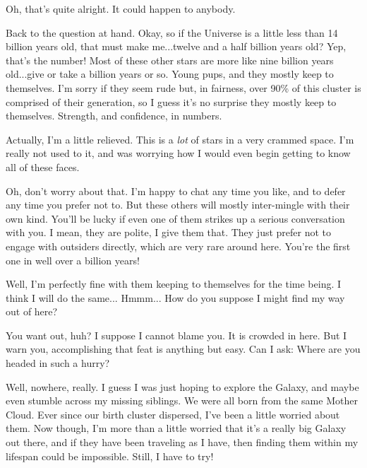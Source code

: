 \documentclass[main.tex]{subfiles}
\begin{document}
\par \Sterope Oh, that's quite alright.  It could happen to anybody.

\par \Enrico Back to the question at hand.  Okay, so if the Universe is a little less than 14 billion years old, that must make me...twelve and a half billion years old?  Yep, that's the number!  Most of these other stars are more like nine billion years old...give or take a billion years or so.  Young pups, and they mostly keep to themselves.  I'm sorry if they seem rude but, in fairness, over 90\% of this cluster is comprised of their generation, so I guess it's no surprise they mostly keep to themselves.  Strength, and confidence, in numbers.

\par \Sterope Actually, I'm a little relieved.  This is a \textit{lot} of stars in a very crammed space.  I'm really not used to it, and was worrying how I would even begin getting to know all of these faces.

\par \Enrico Oh, don't worry about that.  I'm happy to chat any time you like, and to defer any time you prefer not to.  But these others will mostly inter-mingle with their own kind.  You'll be lucky if even one of them strikes up a serious conversation with you.  I mean, they are polite, I give them that.  They just prefer not to engage with outsiders directly, which are very rare around here.  You're the first one in well over a billion years!  

\par \Sterope Well, I'm perfectly fine with them keeping to themselves for the time being.  I think I will do the same... Hmmm... How do you suppose I might find my way out of here?

\par \Enrico You want out, huh?  I suppose I cannot blame you.  It is crowded in here.  But I warn you, accomplishing that feat is anything but easy.  Can I ask:  Where are you headed in such a hurry?

\par \Sterope Well, nowhere, really.  I guess I was just hoping to explore the Galaxy, and maybe even stumble across my missing siblings.  We were all born from the same Mother Cloud.  Ever since our birth cluster dispersed, I've been a little worried about them.  Now though, I'm more than a little worried that it's a really big Galaxy out there, and if they have been traveling as I have, then finding them within my lifespan could be impossible.  Still, I have to try!
\end{document}
